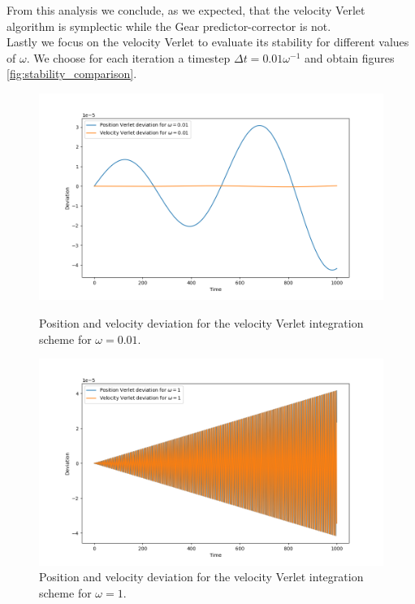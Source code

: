 From this analysis we conclude, as we expected, that the velocity Verlet algorithm is symplectic while the Gear predictor-corrector is not. \\
Lastly we focus on the velocity Verlet to evaluate its stability for different values of $\omega$. We choose for each iteration a timestep $\Delta t= 0.01\omega^{-1}$ and obtain figures \ref{fig:stability_comparison}.

\begin{figure}[h!]
    \centering
    \begin{minipage}{0.45\textwidth}
        \centering
        \includegraphics[width=\textwidth]{FIG/ex9/stability_comparison_0.png}
        \caption{Position and velocity deviation for the velocity Verlet integration scheme for $\omega = 0.01$.}
        \label{fig:stability_comparison_0}
    \end{minipage}
    \hfill
    \begin{minipage}{0.45\textwidth}
        \centering
        \includegraphics[width=\textwidth]{FIG/ex9/stability_comparison_1.png}
        \caption{Position and velocity deviation for the velocity Verlet integration scheme for $\omega=1$.}
        \label{fig:stability_comparison_1}
    \end{minipage}
    

\end{figure}
